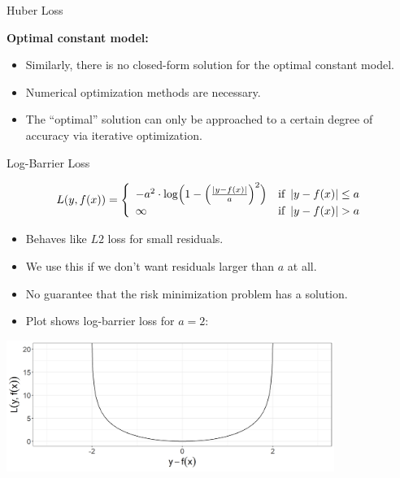 \begin{vbframe}{Huber Loss}
\vspace*{0.2cm}

\textbf{Optimal constant model:}
\begin{itemize}
\item Similarly, there is no closed-form solution for the optimal constant model. 
\item Numerical optimization methods are necessary. 
\item The \enquote{optimal} solution can only be approached to a certain degree of accuracy via iterative optimization.
\end{itemize}

\end{vbframe}



\begin{vbframe}{Log-Barrier Loss}

\begin{small}
\[
  L(y, f(x)) = \left\{\begin{array}{lr}
        -a^{2} \cdot \log \Bigl( 1 - \Bigl(\frac{\left|y - f(x)\right|}{a}\Bigr)^2 \Bigr) & \text{if } \left|y-f(x)\right| \leq a \\
        \infty & \text{if } \left|y-f(x)\right|  > a
        \end{array}\right.
  \]
\end{small}

\begin{itemize}
\item Behaves like $L2$ loss for small residuals.
\item We use this if we don't want residuals larger than $a$ at all.
\item No guarantee that the risk minimization problem has a solution.
\item Plot shows log-barrier loss for $a=2$:
\end{itemize}

\begin{center}
\includegraphics[width = 0.8\textwidth]{figure/loss_logbarrier_1.png}
\end{center}


\end{vbframe}



